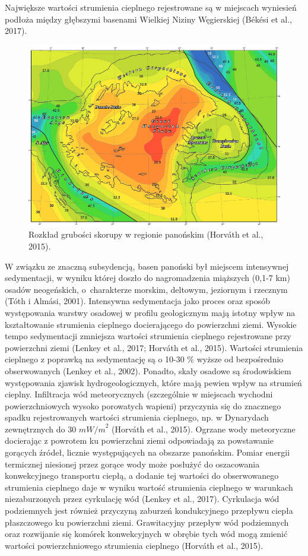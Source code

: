 \documentclass[11.5pt,twoside]{report}
\begin{document}
Największe wartości strumienia cieplnego rejestrowane są w miejscach wyniesień podłoża między głębszymi basenami Wielkiej Niziny Węgierskiej (B\'{e}k\'{e}si et al., 2017). 

\begin{figure}[h]
	\centering
	\includegraphics[width=0.7\linewidth]{"../Termika/grubosc skorupy"}
	\caption{Rozkład grubości skorupy w regionie panońskim (Horváth et al., 2015).}
	\label{fig:grubosc-skorupy}
\end{figure}

 W związku ze znaczną subsydencją, basen panoński był miejscem intensywnej sedymentacji, w wyniku której doszło do nagromadzenia miąższych (0,1-7 km) osadów neogeńskich, o~charakterze morskim, deltowym, jeziornym i rzecznym (T\'{o}th i Alm\'{a}si, 2001). Intensywna sedymentacja jako proces oraz sposób występowania warstwy osadowej w profilu geologicznym mają istotny wpływ na kształtowanie strumienia cieplnego docierającego do powierzchni ziemi. Wysokie tempo sedymentacji zmniejsza wartości strumienia cieplnego rejestrowane przy powierzchni ziemi (Lenkey et al., 2017; Horv\'{a}th et al., 2015). Wartości strumienia cieplnego z poprawką na sedymentację są o 10-30 \% wyższe od bezpośrednio obserwowanych (Lenkey et al., 2002). Ponadto, skały osadowe są środowiskiem występowania zjawisk hydrogeologicznych, które mają pewien wpływ na strumień cieplny. Infiltracja wód meteorycznych (szczególnie w miejscach wychodni powierzchniowych wysoko porowatych wapieni) przyczynia się do znacznego spadku rejestrowanych wartości strumienia cieplnego, np. w Dynarydach zewnętrznych do 30 ${mW/m}^{2}$ (Horv\'{a}th et al., 2015). Ogrzane wody meteoryczne docierając z powrotem ku powierzchni ziemi odpowiadają za powstawanie gorących \'{z}ródeł, licznie występujących na obszarze panońskim. Pomiar energii termicznej niesionej przez gorące wody może posłużyć do oszacowania konwekcyjnego transportu ciepłą, a dodanie tej wartości do obserwowanego strumienia cieplnego daje w wyniku wartość strumienia cieplnego w warunkach niezaburzonych przez cyrkulację wód (Lenkey et al., 2017). Cyrkulacja wód podziemnych jest również przyczyną zaburzeń kondukcyjnego przepływu ciepła płaszczowego ku powierzchni ziemi. Grawitacyjny przepływ wód podziemnych oraz rozwijanie się komórek konwekcyjnych w obrębie tych wód mogą zmienić wartości powierzchniowego strumienia cieplnego (Horv\'{a}th et al., 2015). 
 
\end{document}
